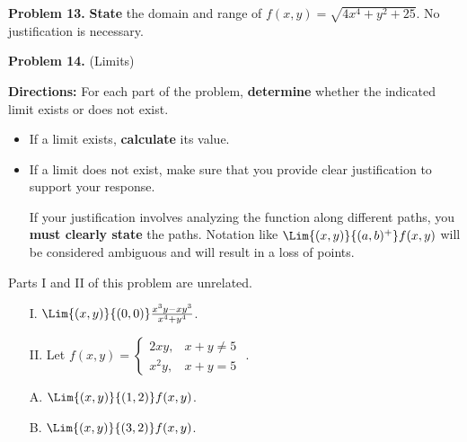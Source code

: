 \documentclass{ximera}
\begin{document}
\textbf{Problem 13.} \textbf{State} the domain and range of $f(x,y) = \sqrt{4x^4+y^2+25}$.  No justification is necessary.

\vspace{35mm}



\vspace{50mm}
\newpage
\textbf{Problem 14.} (Limits) 

\textbf{Directions:}  For each part of the problem, \textbf{determine} whether the indicated limit exists or does not exist.  

\begin{itemize}
\item If a limit exists, \textbf{calculate} its value.  
\item If a limit does not exist, make sure that you provide clear justification to support your response.  

If your justification involves analyzing the function along different paths, you \textbf{must clearly state} the paths. Notation like $\Lim{(x,y)}{(a,b)^+} f(x,y)$ will be considered ambiguous and will result in a loss of points.
\end{itemize}

Parts I and II of this problem are unrelated.
\begin{enumerate}
\item[I.] $\Lim{(x,y)}{(0,0)} \frac{x^3y-xy^3}{x^4+y^4}$.

\vspace{25mm}

\item[II.] Let $f(x,y) =  \begin{cases} 2xy , & x+y \neq 5 \\[2 ex]  x^2y , & x+y = 5 \end{cases} $ . 

\item[A.] $\Lim{(x,y)}{(1,2)}f(x,y)$.

\vspace{25mm}

\item[B.] $\Lim{(x,y)}{(3,2)}f(x,y)$.


\end{enumerate}
 
\end{document}
